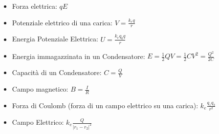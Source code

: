 \documentclass{article}
\begin{document}
\begin{itemize}
    \item Forza elettrica: $qE$
    \item Potenziale elettrico di una carica: $V=\frac{k_eq}{r}$
    \item Energia Potenziale Elettrica: $U=\frac{k_eq_0q}{r}$
\end{itemize}

\begin{itemize}
    \item Energia immagazzinata in un Condensatore: $E=\frac{1}{2}QV=\frac{1}{2}CV^2=\frac{Q^2}{2C}$
    \item Capacità di un Condensatore: $C=\frac{Q}{V}$
    \item Campo magnetico: $B=\frac{I}{R}$
\end{itemize}

\begin{itemize}
    \item Forza di Coulomb (forza di un campo elettrico su una carica): $k_e\frac{q_1q_2}{r^2}$
    \item Campo Elettrico: $k_e\frac{Q}{|r_1-r_2|^2}$
    
\end{itemize}
\end{document}
